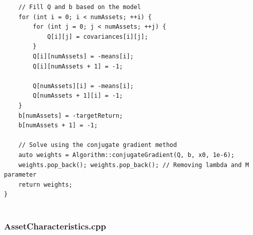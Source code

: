 \documentclass[12pt,twoside]{article}
\begin{document}
\begin{verbatim}
    // Fill Q and b based on the model
    for (int i = 0; i < numAssets; ++i) {
        for (int j = 0; j < numAssets; ++j) {
            Q[i][j] = covariances[i][j];
        }
        Q[i][numAssets] = -means[i];
        Q[i][numAssets + 1] = -1;

        Q[numAssets][i] = -means[i];
        Q[numAssets + 1][i] = -1;
    }
    b[numAssets] = -targetReturn;
    b[numAssets + 1] = -1;

    // Solve using the conjugate gradient method
    auto weights = Algorithm::conjugateGradient(Q, b, x0, 1e-6);
    weights.pop_back(); weights.pop_back(); // Removing lambda and M parameter
    return weights;
}


\end{verbatim}



\subsubsection{AssetCharacteristics.cpp}
\scriptsize
\end{document}
